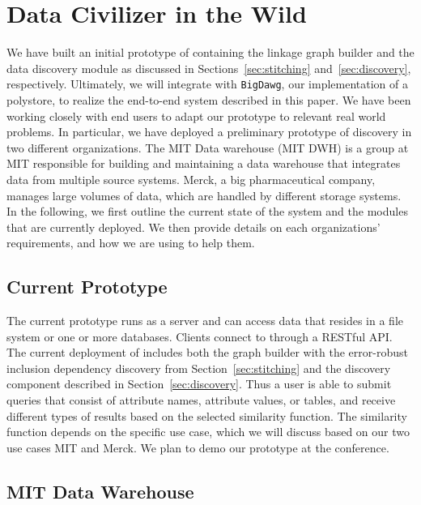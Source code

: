 \vspace{-.1em}
\section{Data Civilizer in the Wild}
\label{sec:wild}

We have built an initial prototype of \dcv containing 
the linkage graph builder 
and the data discovery module
as discussed in Sections~\ref{sec:stitching}
and~\ref{sec:discovery}, respectively. Ultimately, we will integrate \dcv with
\texttt{BigDawg}, our implementation of a polystore, to realize the end-to-end
system described in this paper. We have been working closely with end users to
adapt our prototype to relevant real world problems. In particular, we have
deployed a preliminary prototype of discovery in two different organizations. The
MIT Data warehouse (MIT DWH) is a group at MIT responsible for building and
maintaining a data warehouse that integrates data from multiple source systems.
Merck, a big pharmaceutical company, manages large volumes of data, which are
handled by different storage systems.  In the following, we first outline the
current state of the system and the modules that are currently deployed.  We
then provide details on each organizations' requirements, and how we are using
\dcv to help them.

\subsection{Current \titledcv Prototype} 

The current prototype runs as a
server and can access data that resides in a file system or one or more
databases.  Clients  connect to \dcv through a RESTful API.  The current
deployment of \dcv  includes both  the graph builder with the error-robust
inclusion dependency discovery from Section~\ref{sec:stitching} and the
discovery component described in Section~\ref{sec:discovery}.  Thus a user is
able to submit queries that consist of attribute names, attribute values, or
tables, and receive different types of results based on the selected
similarity function. The similarity function depends on the specific use case,
which we will discuss based on our two use cases MIT and Merck.  We plan to
demo our \dcv prototype at the conference.

\vspace{-.5em}
\subsection{MIT Data Warehouse}

